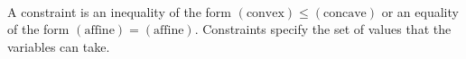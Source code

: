 \\
A constraint is an inequality of the form $(\mbox{convex}) \le (\text{concave})$ or an equality of the form $(\text{affine}) = (\text{affine})$. Constraints specify the set of values that the variables can take.
